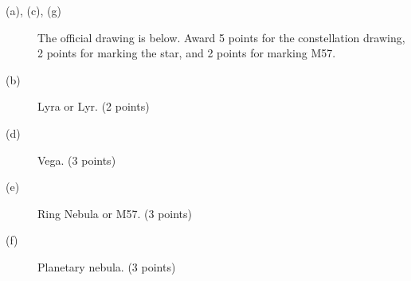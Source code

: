 \begin{description}
\item[(a), (c), (g)] The official drawing is below. Award 5 points for the constellation drawing, 2 points for marking the star, and 2 points for marking M57.
\item[(b)] Lyra or Lyr. \hfill(2 points)
\item[(d)] Vega. \hfill(3 points)
\item[(e)] Ring Nebula or M57. \hfill(3 points)
\item[(f)] Planetary nebula. \hfill(3 points)
\end{description}

